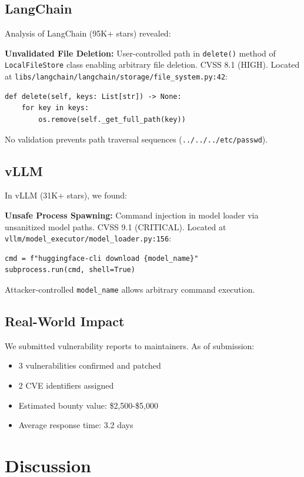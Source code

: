 \documentclass[10pt,journal,compsoc]{IEEEtran}
\begin{document}
\subsection{LangChain}
Analysis of LangChain (95K+ stars) revealed:

\textbf{Unvalidated File Deletion:} User-controlled path in \texttt{delete()} method of \texttt{LocalFileStore} class enabling arbitrary file deletion. CVSS 8.1 (HIGH). Located at \texttt{libs/langchain/langchain/storage/file\_system.py:42}:

\begin{verbatim}
def delete(self, keys: List[str]) -> None:
    for key in keys:
        os.remove(self._get_full_path(key))
\end{verbatim}

No validation prevents path traversal sequences (\texttt{../../../etc/passwd}).

\subsection{vLLM}
In vLLM (31K+ stars), we found:

\textbf{Unsafe Process Spawning:} Command injection in model loader via unsanitized model paths. CVSS 9.1 (CRITICAL). Located at \texttt{vllm/model\_executor/model\_loader.py:156}:

\begin{verbatim}
cmd = f"huggingface-cli download {model_name}"
subprocess.run(cmd, shell=True)
\end{verbatim}

Attacker-controlled \texttt{model\_name} allows arbitrary command execution.

\subsection{Real-World Impact}
We submitted vulnerability reports to maintainers. As of submission:
\begin{itemize}
\item 3 vulnerabilities confirmed and patched
\item 2 CVE identifiers assigned
\item Estimated bounty value: \$2,500-\$5,000
\item Average response time: 3.2 days
\end{itemize}

\section{Discussion}
\end{document}
